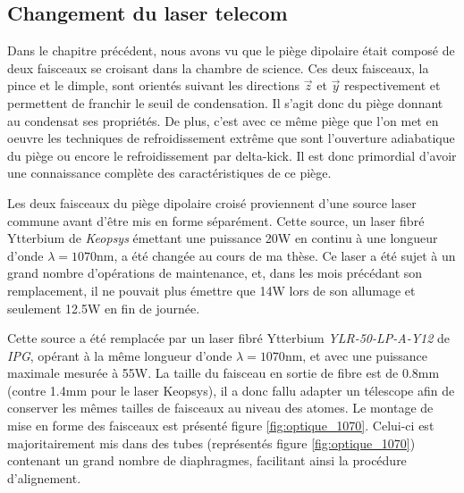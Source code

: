 \subsection{Changement du laser telecom}
Dans le chapitre précédent, nous avons vu que le piège dipolaire était composé de deux faisceaux se croisant dans la chambre de science. Ces deux faisceaux, la pince et le dimple, sont orientés suivant les directions $\vec{z}$ et $\vec{y}$ respectivement et permettent de franchir le seuil de condensation. Il s'agit donc du piège donnant au condensat ses propriétés. De plus, c'est avec ce même piège que l'on met en oeuvre les techniques de refroidissement extrême que sont l'ouverture adiabatique du piège ou encore le refroidissement par delta-kick. Il est donc primordial d'avoir une connaissance complète des caractéristiques de ce piège.

Les deux faisceaux du piège dipolaire croisé proviennent d'une source laser commune avant d'être mis en forme séparément. Cette source, un laser fibré Ytterbium de \emph{Keopsys} émettant une puissance 20W en continu à une longueur d'onde $\lambda=1070$nm, a été changée au cours de ma thèse. Ce laser a été sujet à un grand nombre d'opérations de maintenance, et, dans les mois précédant son remplacement, il ne pouvait plus émettre que 14W lors de son allumage et seulement 12.5W en fin de journée.
 
Cette source a été remplacée par un laser fibré Ytterbium \emph{YLR-50-LP-A-Y12} de \emph{IPG}, opérant à la même longueur d'onde $\lambda=1070$nm, et avec une puissance maximale mesurée à 55W. La taille du faisceau en sortie de fibre est de 0.8mm (contre 1.4mm pour le laser Keopsys), il a donc fallu adapter un télescope afin de conserver les mêmes tailles de faisceaux au niveau des atomes. Le montage de mise en forme des faisceaux est présenté figure \ref{fig:optique_1070}. Celui-ci est majoritairement mis dans des tubes (représentés figure \ref{fig:optique_1070}) contenant un grand nombre de diaphragmes, facilitant ainsi la procédure d'alignement.

